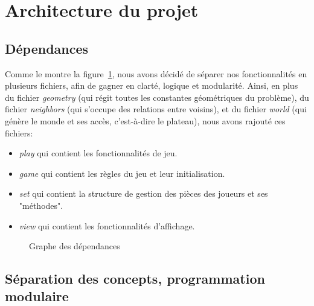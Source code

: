 \documentclass{article}
\begin{document}
\newpage
\section{Architecture du projet}
\subsection{Dépendances}
Comme le montre la figure~\ref{depend}, nous avons décidé de séparer nos fonctionnalités en plusieurs fichiers, afin de gagner en clarté, logique et modularité. Ainsi, en plus du fichier
\textit{geometry} (qui régit toutes les constantes géométriques du problème), du fichier \textit{neighbors} (qui s'occupe des relations entre voisins),
et du fichier \textit{world} (qui génère le monde et ses accès, c'est-à-dire le plateau),  nous avons rajouté ces fichiers:
\\
\begin{itemize}
    \item \textit{play} qui contient les fonctionnalités de jeu.
    \item \textit{game} qui contient les règles du jeu et leur initialisation.
    \item \textit{set} qui contient la structure de gestion des pièces des joueurs et ses "méthodes".
    \item \textit{view} qui contient les fonctionnalités d'affichage.
\end{itemize}

\begin{figure}[h]
    \centering
    \caption{Graphe des dépendances}
    \label{depend}
\end{figure}

\subsection{Séparation des concepts, programmation modulaire}
\end{document}

